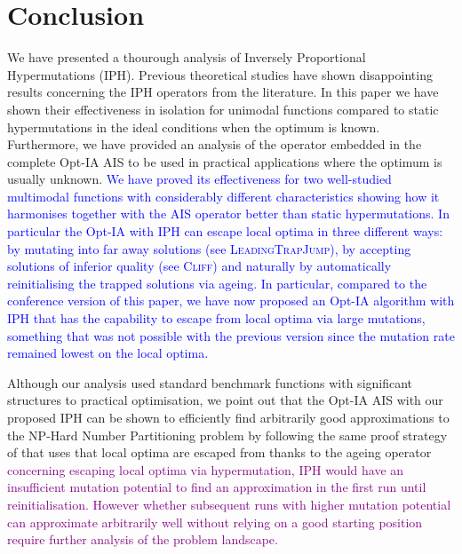 \documentclass[lettersize,journal]{IEEEtran}
\newcommand{\new}[1]{\textcolor{blue}{#1}}
\begin{document}

%



\section{Conclusion}
We have presented a thourough analysis of Inversely Proportional Hypermutations (IPH).
Previous theoretical studies have shown disappointing results concerning the IPH operators from the literature.
In this paper we have 
shown their effectiveness in isolation for unimodal functions compared to static hypermutations in the ideal conditions when the optimum is known.
Furthermore, we have provided an analysis of the operator embedded in the complete Opt-IA AIS to be used in practical applications where the optimum is usually unknown.
\new{We have proved its effectiveness for two well-studied multimodal functions with considerably different characteristics showing how it harmonises together with the AIS operator better than static hypermutations.
In particular the Opt-IA with IPH can escape local optima in three different ways: by mutating into far away solutions (see \textsc{LeadingTrapJump}), by accepting solutions of inferior quality (see \textsc{Cliff}) and naturally by automatically reinitialising the trapped solutions via ageing.
In particular, compared to the conference version of this paper, we have now proposed an Opt-IA algorithm with IPH that has the capability to escape from local optima via large mutations, something that was not possible with the previous version since the mutation rate remained lowest on the local optima.
}

Although our analysis used standard benchmark functions with significant structures to practical optimisation, we point out that the Opt-IA AIS with our proposed IPH can be shown to efficiently find arbitrarily good approximations to the NP-Hard Number Partitioning problem by following the same proof strategy of \cite{CorusOlivetoYazdaniAIJ2019} that uses that local optima are escaped from thanks to the ageing operator \textcolor{purple}{concerning escaping local optima via hypermutation, IPH would have an insufficient mutation potential to find an approximation in the first run until reinitialisation. However whether subsequent runs with higher mutation potential can approximate arbitrarily well without relying on a good starting position  require further analysis of the problem landscape.} 
\end{document}
